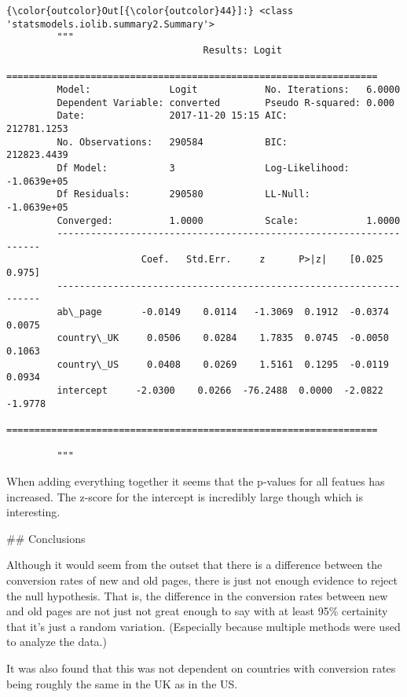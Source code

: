\documentclass[11pt]{article}
\begin{document}
\begin{Verbatim}[commandchars=\\\{\}]
{\color{outcolor}Out[{\color{outcolor}44}]:} <class 'statsmodels.iolib.summary2.Summary'>
         """
                                   Results: Logit
         ==================================================================
         Model:              Logit            No. Iterations:   6.0000     
         Dependent Variable: converted        Pseudo R-squared: 0.000      
         Date:               2017-11-20 15:15 AIC:              212781.1253
         No. Observations:   290584           BIC:              212823.4439
         Df Model:           3                Log-Likelihood:   -1.0639e+05
         Df Residuals:       290580           LL-Null:          -1.0639e+05
         Converged:          1.0000           Scale:            1.0000     
         -------------------------------------------------------------------
                        Coef.   Std.Err.     z      P>|z|    [0.025   0.975]
         -------------------------------------------------------------------
         ab\_page       -0.0149    0.0114   -1.3069  0.1912  -0.0374   0.0075
         country\_UK     0.0506    0.0284    1.7835  0.0745  -0.0050   0.1063
         country\_US     0.0408    0.0269    1.5161  0.1295  -0.0119   0.0934
         intercept     -2.0300    0.0266  -76.2488  0.0000  -2.0822  -1.9778
         ==================================================================
         
         """
\end{Verbatim}
            
    When adding everything together it seems that the p-values for all
featues has increased. The z-score for the intercept is incredibly large
though which is interesting.

     \#\# Conclusions

    Although it would seem from the outset that there is a difference
between the conversion rates of new and old pages, there is just not
enough evidence to reject the null hypothesis. That is, the difference
in the conversion rates between new and old pages are not just not great
enough to say with at least 95\% certainity that it's just a random
variation. (Especially because multiple methods were used to analyze the
data.)

It was also found that this was not dependent on countries with
conversion rates being roughly the same in the UK as in the US.


    
    
    
    
\end{document}
